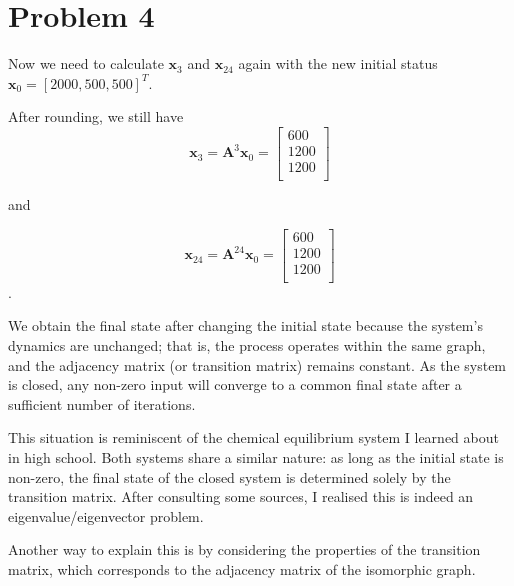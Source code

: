 \documentclass[12pt,a4paper]{article}
\begin{document}
\section*{Problem 4}
\begin{solution}
Now we need to calculate $\mathbf{x}_3$ and $\mathbf{x}_{24}$ again with the new initial status $\mathbf{x}_0=[2000,500,500]^T$.

After rounding, we still have 
\[
\mathbf{x}_3 = 
\mathbf{A}^3 \mathbf{x}_0 =  
\left[
\begin{array}{ccc}
600\\
1200\\
1200\\
\end{array}
\right]
\]

and 

\[
\mathbf{x}_{24} =
\mathbf{A}^{24} \mathbf{x}_0 =  
\left[
\begin{array}{ccc}
600\\
1200\\
1200\\
\end{array}
\right]
\].

\begin{remark}
We obtain the final state after changing the initial state because the system's dynamics are unchanged; that is, the process operates within the same graph, and the adjacency matrix (or transition matrix) remains constant. As the system is closed, any non-zero input will converge to a common final state after a sufficient number of iterations.

This situation is reminiscent of the chemical equilibrium system I learned about in high school. Both systems share a similar nature: as long as the initial state is non-zero, the final state of the closed system is determined solely by the transition matrix. After consulting some sources, I realised this is indeed an eigenvalue/eigenvector problem.

Another way to explain this is by considering the properties of the transition matrix, which corresponds to the adjacency matrix of the isomorphic graph.


\end{remark}
\end{solution}
\end{document}
